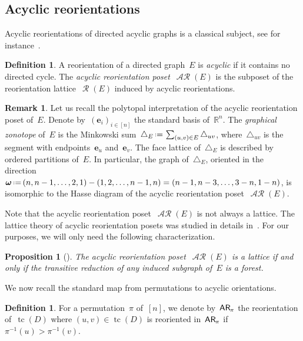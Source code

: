 \documentclass{amsart}
\newtheorem{proposition}[theorem]{Proposition}
\theoremstyle{definition}
\newtheorem{definition}[theorem]{Definition}
\newtheorem{remark}[theorem]{Remark}
\newcommand{\R}{\mathbb{R}} %
\renewcommand{\b}[1]{\boldsymbol{#1}} %
\renewcommand{\c}[1]{\mathcal{#1}} %
\newcommand{\eqdef}{\mbox{\,\raisebox{0.2ex}{\scriptsize\ensuremath{\mathrm:}}\ensuremath{=}\,}} %
\newcommand{\simplex}{\triangle} %
\DeclareMathOperator{\tc}{tc} %
\newcommand{\darkblue}{\color{darkblue}} %
\newcommand{\defn}[1]{\textsl{\darkblue #1}} %
\newcommand{\mymap}[2]{\mathsf{#1}_{\hspace{-.7pt}#2}}
\DeclareMathOperator{\Reori}{\c{R}}  %
\DeclareMathOperator{\AReori}{\c{AR}}  %
\newcommand{\areori}[1]{\mymap{AR}{#1}}  %
\begin{document}
\subsection{Acyclic reorientations}

Acyclic reorientations of directed acyclic graphs is a classical subject, see for instance~\cite{Pilaud-acyclicReorientationLattices}.

\begin{definition}
A reorientation of a directed graph~$E$ is \defn{acyclic} if it contains no directed cycle.
The \defn{acyclic reorientation poset}~$\AReori(E)$ is the subposet of the reorientation lattice~$\Reori(E)$ induced by acyclic reorientations.
\end{definition}

\begin{remark}
Let us recall the polytopal interpretation of the acyclic reorientation poset of~$E$.
Denote by~$(\b{e}_i)_{i \in [n]}$ the standard basis of~$\R^n$.
The \defn{graphical zonotope} of~$E$ is the Minkowski sum~$\simplex_E \eqdef \sum_{(u,v) \in E} \simplex_{uv}$, where~$\simplex_{uv}$ is the segment with endpoints~$\b{e}_u$ and~$\b{e}_v$.
The face lattice of~$\simplex_E$ is described by ordered partitions of~$E$.
In particular, the graph of~$\simplex_E$, oriented in the direction~$\b{\omega} \eqdef (n, n-1, \dots, 2, 1) - (1, 2, \dots, n-1, n) = (n-1, n-3, \dots, 3-n, 1-n)$, is isomorphic to the Hasse diagram of the acyclic reorientation poset~$\AReori(E)$.
\end{remark}

Note that the acyclic reorientation poset~$\AReori(E)$ is not always a lattice.
The lattice theory of acyclic reorientation posets was studied in details in~\cite{Pilaud-acyclicReorientationLattices}.
For our purposes, we will only need the following characterization.

\begin{proposition}[{\cite[Thm.~1]{Pilaud-acyclicReorientationLattices}}]
\label{prop:acyclicReorientationLattices}
The acyclic reorientation poset~$\AReori(E)$ is a lattice if and only if the transitive reduction of any induced subgraph of~$E$ is a forest.
\end{proposition}

We now recall the standard map from permutations to acyclic orientations.

\begin{definition}
For a permutation~$\pi$ of~$[n]$, we denote by~$\areori{\pi}$ the reorientation of~$\tc(D)$ where $(u,v) \in \tc(D)$ is reoriented in~$\areori{\pi}$ if~$\pi^{-1}(u) > \pi^{-1}(v)$.
\end{definition}
\end{document}

